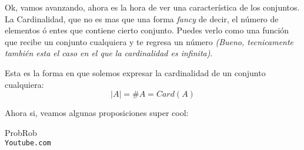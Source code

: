 \documentclass[12pt]{report}                                %
\begin{document}
        Ok, vamos avanzando, ahora es la hora de ver una característica de los conjuntos.
        La Cardinalidad, que no es mas que una forma \emph{fancy} de decir, el número de 
        elementos ó entes que contiene cierto conjunto. Puedes verlo como una función que
        recibe un conjunto cualquiera y te regresa un número \emph{(Bueno, tecnicamente también
        esta el caso en el que la cardinalidad es infinita)}.

        Esta es la forma en que solemos expresar la cardinalidad de un conjunto cualquiera:
        \begin{equation}   
            |A| = \#A = Card(A)
        \end{equation}


        Ahora si, veamos algunas proposiciones super cool:





\clearpage

	\begin{thebibliography}{9}

		ProbRob
		\\\texttt{Youtube.com}


	 

\end{thebibliography}
\end{document}
